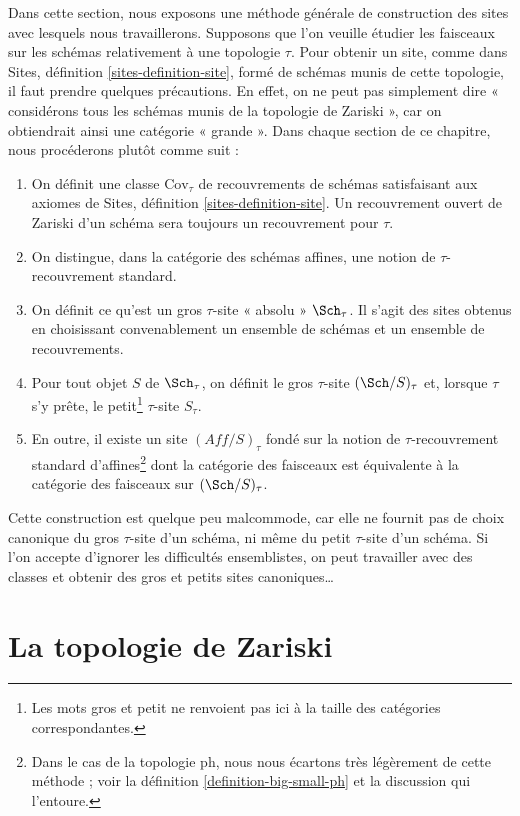\noindent
Dans cette section, nous exposons une méthode générale de construction des
sites avec lesquels nous travaillerons. Supposons que l'on veuille étudier les faisceaux
sur les schémas relativement à une topologie $\tau$. Pour obtenir
un site, comme dans Sites, définition \ref{sites-definition-site},
formé de schémas munis de cette topologie, il faut prendre quelques précautions. En effet,
on ne peut pas simplement dire « considérons tous les schémas munis de la topologie de Zariski »,
car on obtiendrait ainsi une catégorie « grande ». Dans chaque section de
ce chapitre, nous procéderons plutôt comme suit :
\begin{enumerate}
\item On définit une classe $\text{Cov}_\tau$ de recouvrements de schémas
satisfaisant aux axiomes de Sites, définition \ref{sites-definition-site}.
Un recouvrement ouvert de Zariski d'un
schéma sera toujours un recouvrement pour $\tau$.
\item On distingue, dans la catégorie des schémas affines, une notion de
$\tau$-recouvrement standard.
\item On définit ce qu'est un gros $\tau$-site « absolu » $\Sch_\tau$.
Il s'agit des sites obtenus en choisissant convenablement un ensemble de schémas
et un ensemble de recouvrements.
\item Pour tout objet $S$ de $\Sch_\tau$,
on définit le gros $\tau$-site $(\Sch/S)_\tau$ et, lorsque
$\tau$ s'y prête, le petit\footnote{Les mots gros et
petit ne renvoient pas ici à la taille des catégories
correspondantes.} $\tau$-site $S_\tau$.
\item En outre, il existe un site $(\textit{Aff}/S)_\tau$ fondé sur la
notion de $\tau$-recouvrement standard d'affines\footnote{Dans le cas
de la topologie ph, nous nous écartons très légèrement de cette méthode ; voir la
définition \ref{definition-big-small-ph} et la discussion qui l'entoure.}
dont la catégorie des faisceaux
est équivalente à la catégorie des faisceaux sur $(\Sch/S)_\tau$.
\end{enumerate}
Cette construction est quelque peu malcommode, car elle ne fournit pas de choix canonique
du gros $\tau$-site d'un schéma, ni même du petit
$\tau$-site d'un schéma. Si l'on accepte d'ignorer les difficultés
ensemblistes, on peut travailler avec des classes et obtenir
des gros et petits sites canoniques…







\section{La topologie de Zariski}
\label{section-zariski}

